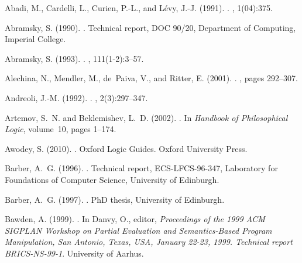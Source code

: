 \documentclass[a4paper]{amsart}
\begin{document}
\begin{thebibliography}{}

Abadi, M., Cardelli, L., Curien, P.-L., and L{\'{e}}vy, J.-J. (1991).
.
, 1(04):375.

Abramsky, S. (1990).
.
\newblock Technical report, DOC 90/20, Department of Computing, Imperial
  College.

Abramsky, S. (1993).
.
, 111(1-2):3--57.

Alechina, N., Mendler, M., de~Paiva, V., and Ritter, E. (2001).
.
, pages 292--307.

Andreoli, J.-M. (1992).
.
, 2(3):297--347.

Artemov, S.~N. and Beklemishev, L.~D. (2002).
.
\newblock In {\em Handbook of Philosophical Logic}, volume~10, pages 1--174.

Awodey, S. (2010).
.
\newblock Oxford Logic Guides. Oxford University Press.

Barber, A.~G. (1996).
.
\newblock Technical report, ECS-LFCS-96-347, Laboratory for Foundations of
  Computer Science, University of Edinburgh.

Barber, A.~G. (1997).
.
\newblock PhD thesis, University of Edinburgh.

Bawden, A. (1999).
.
\newblock In Danvy, O., editor, {\em Proceedings of the 1999 ACM SIGPLAN
  Workshop on Partial Evaluation and Semantics-Based Program Manipulation, San
  Antonio, Texas, USA, January 22-23, 1999. Technical report BRICS-NS-99-1}.
  University of Aarhus.


\end{thebibliography}
\end{document}
